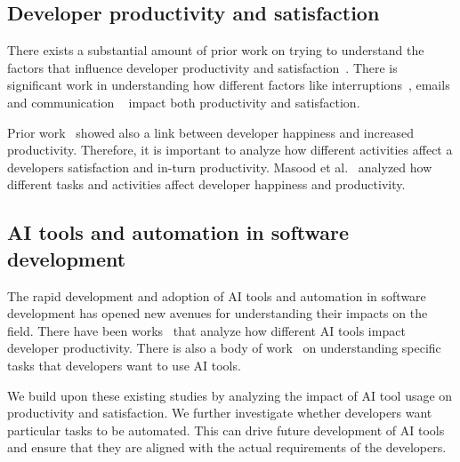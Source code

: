 \subsection{Developer productivity and satisfaction}
There exists a substantial amount of prior work on trying to understand the factors that influence developer productivity and satisfaction~\cite{storey2019towards,space,murphyhill-tse,sadowski-book}. There is significant work in understanding how different factors like interruptions~\cite{mark2008cost, bailey2001effects}, emails and communication ~\cite{houck2023the} impact both productivity and satisfaction.

Prior work~\cite{graziotin2014happy, graziotin2014software, kim2019understanding, emotion_perceive_productivity} showed also a link between developer happiness and increased productivity. Therefore, it is important to analyze how different activities affect a developers satisfaction and in-turn productivity. Masood et al.~\cite{like_dislike} analyzed how different tasks and activities affect developer happiness and productivity. 


\subsection{AI tools and automation in software development}

The rapid development and adoption of AI tools and automation in software development has opened new avenues for understanding their impacts on the field. There have been works~\cite{copilot_prod, borg2024does, ulfsnes2024transforming, peng2023impact} that analyze how different AI tools impact developer productivity. There is also a body of work~\cite{khemka2024towards,bird2022taking} on understanding specific tasks that developers want to use AI tools. 

We build upon these existing studies by analyzing the impact of AI tool usage on productivity and satisfaction. We further investigate whether developers want particular tasks to be automated. This can drive future development of AI tools and ensure that they are aligned with the actual requirements of the developers.